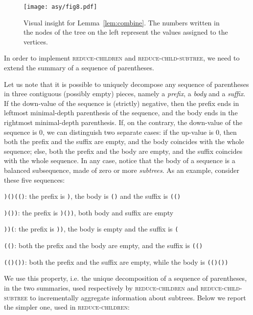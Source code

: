 \documentclass[a4paper,USenglish]{lipics}
\begin{document}
\begin{figure}[t]
\centering\texttt{[image: asy/fig8.pdf]}
\caption{Visual insight for Lemma~\ref{lem:combine}. The numbers written in the nodes of the tree on the left represent the values assigned to the vertices.\label{fig:combine}}
\end{figure}
		

In order to implement \textsc{reduce-children} and \textsc{reduce-child-subtree}, we need to extend the summary of a sequence of parentheses. 

Let us note that it is possible to uniquely decompose any sequence of parentheses in three contiguous (possibly empty) pieces, namely a \emph{prefix}, a \emph{body} and a \emph{suffix}. If the down-value of the sequence is (strictly) negative, then the prefix ends in leftmost minimal-depth parenthesis of the sequence, and the body ends in the rightmost minimal-depth parenthesis. If, on the contrary, the down-value of the sequence is 0, we can distinguish two separate cases: if the up-value is 0, then both the prefix and the suffix are empty, and the body coincides with the whole sequence; else, both the prefix and the body are empty, and the suffix coincides with the whole sequence.
In any case, notice that the body of a sequence is a balanced subsequence, made of zero or more \emph{subtrees}. As an example, consider these five sequences:
\begin{compactitem}
\item \texttt{)()(()}: the prefix is \texttt{)}, the body is \texttt{()} and the suffix is \texttt{(()}
\item \texttt{)())}: the prefix is \texttt{)())}, both body and suffix are empty
\item \texttt{))(}: the prefix is \texttt{))}, the body is empty and the suffix is \texttt{(}
\item \texttt{(()}: both the prefix and the body are empty, and the suffix is \texttt{(()}
\item \texttt{(()())}: both the prefix and the suffix are empty, while the body is \texttt{(()())}
\end{compactitem}
 We use this property, i.e. the unique decomposition of a sequence of parentheses, in the two summaries, used respectively by \textsc{reduce-children} and \textsc{reduce-child-subtree} to incrementally aggregate information about subtrees. Below we report the simpler one, used in \textsc{reduce-children}:
\end{document}
